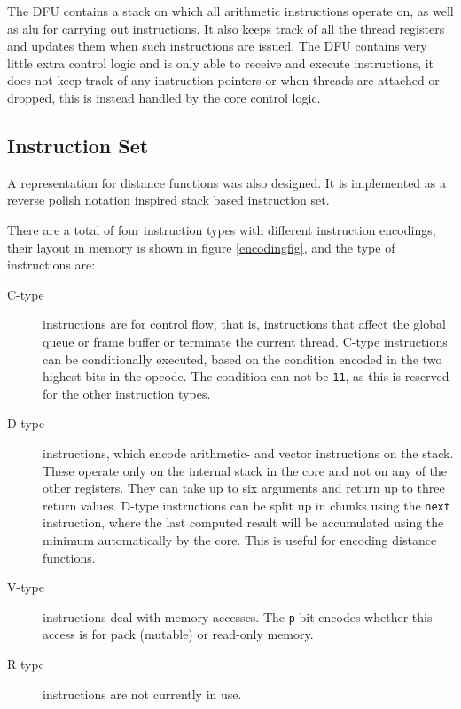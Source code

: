 			The DFU contains a stack on which all arithmetic instructions 
			operate on, as well as alu for carrying out instructions. It also 
			keeps track of all the thread registers and updates them when such
			instructions are issued. The DFU contains very little extra control
			logic and is only able to receive and execute instructions, it does
			not keep track of any instruction pointers or when threads are 
			attached or dropped, this is instead handled by the core control
			logic.

		\subsection{Instruction Set}

			A representation for distance functions was also designed. It is
			implemented as a reverse polish notation inspired stack based 
			instruction set.

			There are a total of four instruction types with different
			instruction encodings, their layout in memory is shown in figure
			\ref{encodingfig}, and the type of instructions are:

			\begin{description}
				\item[C-type] instructions are for control flow, that is, 
					instructions that affect the global queue or frame buffer or
					terminate the current thread. C-type instructions can be 
					conditionally executed, based on the condition encoded in
					the two highest bits in the opcode. The condition can not
					be \texttt{11}, as this is reserved for the other 
					instruction types.

				\item[D-type] instructions, which encode arithmetic- and vector
					instructions on the stack. These operate only on the
					internal stack in the core and not on any of the other
					registers. They can take up to six arguments and return up
					to three return values. D-type instructions can be split up
					in chunks using the \texttt{next} instruction, where the
					last computed result will be accumulated using the minimum
					automatically by the core.  This is useful for encoding
					distance functions.

				\item[V-type] instructions deal with memory accesses. The
					\texttt{p} bit encodes whether this access is for pack
					(mutable) or read-only memory.

				\item[R-type] instructions are not currently in use.
			\end{description}

